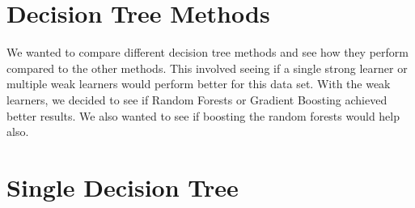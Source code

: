 \documentclass[twoside,11pt]{article}
\theoremstyle{definition}
\begin{document}
\section*{Decision Tree Methods}

We wanted to compare different decision tree methods and see how they perform compared to the other methods. This involved seeing if a single strong learner or multiple weak learners would perform better for this data set. With the weak learners, we decided to see if Random Forests or Gradient Boosting achieved better results. We also wanted to see if boosting the random forests would help also.   

\section*{Single Decision Tree} 
\end{document}
